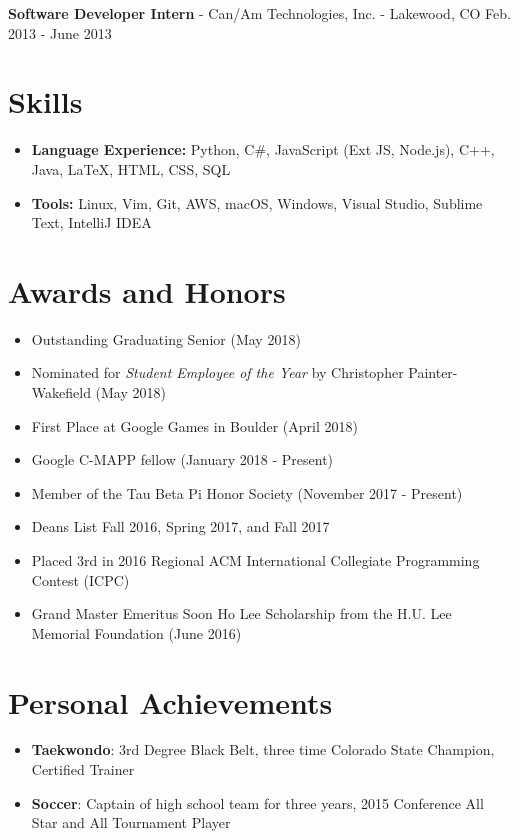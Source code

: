 \documentclass[10pt,letterpaper]{article}
\begin{document}
\vspace{2pt}
\textbf{Software Developer Intern} - Can/Am Technologies, Inc. - Lakewood, CO
\hfill Feb. 2013 - June 2013

\section*{Skills}
{\renewcommand\labelitemi{}
    \renewcommand\leftmargini{0pt}
    \begin{itemize}
        \item \textbf{Language Experience:} Python, C\#, JavaScript (Ext JS,
            Node.js), C++, Java, {\selectfont\LaTeX}, HTML, CSS,
            SQL
        \item \textbf{Tools:} Linux, Vim, Git, AWS, macOS, Windows, Visual
            Studio, Sublime Text, IntelliJ IDEA
    \end{itemize}
}

\section*{Awards and Honors}
\begin{itemize}
    \item Outstanding Graduating Senior (May 2018)
    \item Nominated for \textit{Student Employee of the Year} by Christopher
        Painter-Wakefield (May 2018)
    \item First Place at Google Games in Boulder (April 2018)
    \item Google C-MAPP fellow (January 2018 - Present)
    \item Member of the Tau Beta Pi Honor Society (November 2017 - Present)
    \item Deans List Fall 2016, Spring 2017, and Fall 2017
    \item Placed 3rd in 2016 Regional ACM International Collegiate Programming
        Contest (ICPC)
    \item Grand Master Emeritus Soon Ho Lee Scholarship from the H.U. Lee
        Memorial Foundation (June 2016)
\end{itemize}

\section*{Personal Achievements}
\begin{itemize}
    \item \textbf{Taekwondo}: 3rd Degree Black Belt, three time Colorado State
        Champion, Certified Trainer
    \item \textbf{Soccer}: Captain of high school team for three years, 2015
        Conference All Star and All Tournament Player
\end{itemize}
\end{document}
